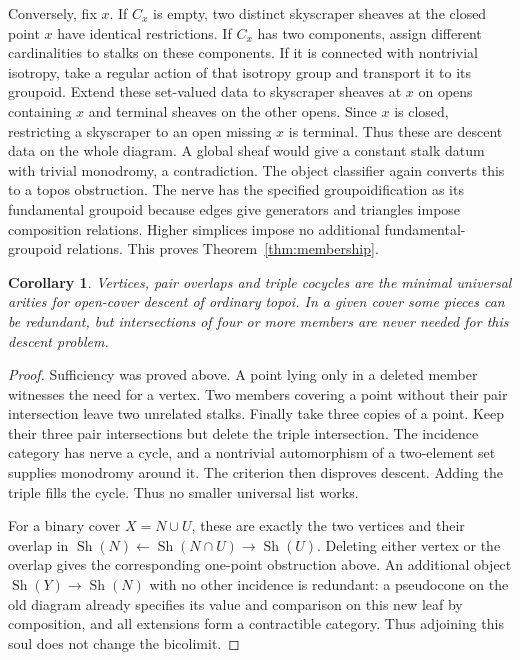 \documentclass[11pt,a4paper]{article}
\newtheorem{corollary}[theorem]{Corollary}
\theoremstyle{definition}
\newcommand{\Sh}{\operatorname{Sh}}
\begin{document}
Conversely, fix $x$. If $C_x$ is empty, two distinct skyscraper sheaves at the closed point $x$ have identical restrictions. If $C_x$ has two components, assign different cardinalities to stalks on these components. If it is connected with nontrivial isotropy, take a regular action of that isotropy group and transport it to its groupoid. Extend these set-valued data to skyscraper sheaves at $x$ on opens containing $x$ and terminal sheaves on the other opens. Since $x$ is closed, restricting a skyscraper to an open missing $x$ is terminal. Thus these are descent data on the whole diagram. A global sheaf would give a constant stalk datum with trivial monodromy, a contradiction. The object classifier again converts this to a topos obstruction. The nerve has the specified groupoidification as its fundamental groupoid because edges give generators and triangles impose composition relations. Higher simplices impose no additional fundamental-groupoid relations. This proves Theorem~\ref{thm:membership}.

\begin{corollary}\label{cor:minimal}
Vertices, pair overlaps and triple cocycles are the minimal universal arities for open-cover descent of ordinary topoi. In a given cover some pieces can be redundant, but intersections of four or more members are never needed for this descent problem.
\end{corollary}
\begin{proof}
Sufficiency was proved above. A point lying only in a deleted member witnesses the need for a vertex. Two members covering a point without their pair intersection leave two unrelated stalks. Finally take three copies of a point. Keep their three pair intersections but delete the triple intersection. The incidence category has nerve a cycle, and a nontrivial automorphism of a two-element set supplies monodromy around it. The criterion then disproves descent. Adding the triple fills the cycle. Thus no smaller universal list works.

For a binary cover $X=N\cup U$, these are exactly the two vertices
and their overlap in $\Sh(N)\leftarrow\Sh(N\cap U)\to\Sh(U)$.
Deleting either vertex or the overlap gives the corresponding
one-point obstruction above. An additional object $\Sh(Y)\to\Sh(N)$
with no other incidence is redundant: a pseudocone on the old diagram
already specifies its value and comparison on this new leaf by
composition, and all extensions form a contractible category. Thus
adjoining this soul does not change the bicolimit.
\end{proof}
\end{document}
